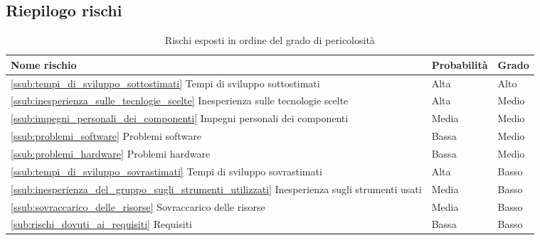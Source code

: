 
	\newpage
	\subsection{Riepilogo rischi} %
	\label{sub:riepilogo_rischi}
		\begin{table}[!h]
			\begin{center}
				\begin{tabularx}{0.9\textwidth}{|l|l|X|}
					\hline
					\textbf{Nome rischio} & \textbf{Probabilità} & \textbf{Grado} \\
					\hline
					\ref{ssub:tempi_di_sviluppo_sottostimati} Tempi di sviluppo sottostimati &
					Alta &
					Alto \\
					\hline
					\ref{ssub:inesperienza_sulle_tecnlogie_scelte} Inesperienza sulle tecnologie scelte &
					Alta &
					Medio \\
					\hline
					\ref{ssub:impegni_personali_dei_componenti} Impegni personali dei componenti &
					Media &
					Medio \\
					\hline
					\ref{ssub:problemi_software} Problemi software &
					Bassa &
					Medio \\
					\hline
					\ref{ssub:problemi_hardware} Problemi hardware &
					Bassa &
					Medio \\
					\hline
					\ref{ssub:tempi_di_sviluppo_sovrastimati}  Tempi di sviluppo sovrastimati &
					Alta &
					Basso \\
					\hline
					\ref{ssub:inesperienza_del_gruppo_sugli_strumenti_utilizzati} Inesperienza sugli strumenti usati &
					Media &
					Basso \\
					\hline
					\ref{ssub:sovraccarico_delle_risorse} Sovraccarico delle risorse &
					Media &
					Basso \\
					\hline
					\ref{sub:rischi_dovuti_ai_requisiti} Requisiti &
					Bassa &
					Basso \\
					\hline	
				\end{tabularx}
			\end{center}
		\caption{Rischi esposti in ordine del grado di pericolosità}
		\end{table}
		
	
